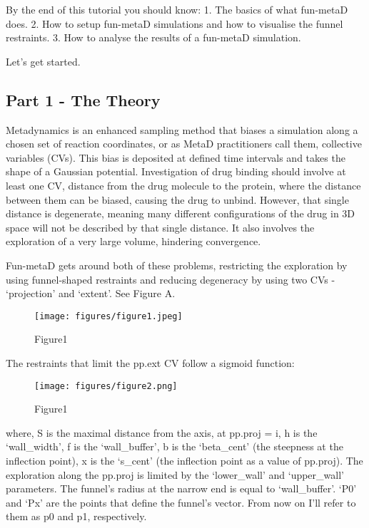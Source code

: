 By the end of this tutorial you should know: 1. The basics of what
fun-metaD does. 2. How to setup fun-metaD simulations and how to
visualise the funnel restraints. 3. How to analyse the results of a
fun-metaD simulation.

Let's get started.

\hypertarget{part-1---the-theory}{%
\subsection{Part 1 - The Theory}\label{part-1---the-theory}}

Metadynamics is an enhanced sampling method that biases a simulation
along a chosen set of reaction coordinates, or as MetaD practitioners
call them, collective variables (CVs). This bias is deposited at defined
time intervals and takes the shape of a Gaussian potential.
Investigation of drug binding should involve at least one CV, distance
from the drug molecule to the protein, where the distance between them
can be biased, causing the drug to unbind. However, that single distance
is degenerate, meaning many different configurations of the drug in 3D
space will not be described by that single distance. It also involves
the exploration of a very large volume, hindering convergence.

Fun-metaD gets around both of these problems, restricting the
exploration by using funnel-shaped restraints and reducing degeneracy by
using two CVs - `projection' and `extent'. See Figure A.

\begin{figure}
\centering
\texttt{[image: figures/figure1.jpeg]}
\caption{Figure1}
\end{figure}

The restraints that limit the pp.ext CV follow a sigmoid function:

\begin{figure}
\centering
\texttt{[image: figures/figure2.png]}
\caption{Figure1}
\end{figure}

where, S is the maximal distance from the axis, at pp.proj = i, h is the
`wall\_width', f is the `wall\_buffer', b is the `beta\_cent' (the
steepness at the inflection point), x is the `s\_cent' (the inflection
point as a value of pp.proj). The exploration along the pp.proj is
limited by the `lower\_wall' and `upper\_wall' parameters. The funnel's
radius at the narrow end is equal to `wall\_buffer'. `P0' and `Px' are
the points that define the funnel's vector. From now on I'll refer to
them as p0 and p1, respectively.

